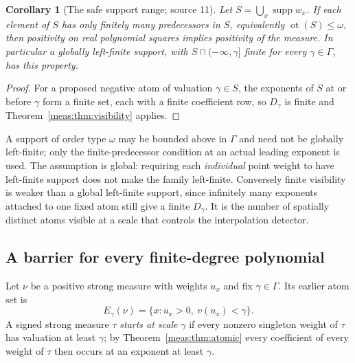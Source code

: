 \documentclass[11pt]{article}
\numberwithin{equation}{section}
\newtheorem{corollary}[theorem]{Corollary}
\theoremstyle{definition}
\theoremstyle{remark}
\newcommand{\supp}{\operatorname{supp}}
\newcommand{\ot}{\operatorname{ot}}
\begin{document}
\begin{corollary}[The safe support range; source 11]\label{meas:cor:safesupport}
Let $S=\bigcup_x\supp w_x$. If each element of $S$ has only finitely many
predecessors in $S$, equivalently $\ot(S)\le\omega$, then positivity on real
polynomial squares implies positivity of the measure. In particular a
globally left-finite support, with $S\cap(-\infty,\gamma]$ finite for every
$\gamma\in\Gamma$, has this property.
\end{corollary}
\begin{proof}
For a proposed negative atom of valuation $\gamma\in S$, the exponents of $S$ at
or before $\gamma$ form a finite set, each with a finite coefficient row, so
$D_\gamma$ is finite and Theorem~\ref{meas:thm:visibility} applies.
\end{proof}

A support of order type $\omega$ may be bounded above in $\Gamma$ and need not
be globally left-finite; only the finite-predecessor condition at an actual
leading exponent is used. The assumption is global: requiring each
\emph{individual} point weight to have left-finite support does not make the
family left-finite. Conversely finite visibility is weaker than a global
left-finite support, since infinitely many exponents attached to one fixed
atom still give a finite $D_\gamma$. It is the number of spatially distinct
atoms visible at a scale that controls the interpolation detector.

\subsection{A barrier for every finite-degree polynomial}

Let $\nu$ be a positive strong measure with weights $u_x$ and fix
$\gamma\in\Gamma$. Its earlier atom set is
\[
 E_\gamma(\nu)=\{x:u_x>0,\ v(u_x)<\gamma\}.
\]
A signed strong measure $\tau$ \emph{starts at scale} $\gamma$ if every nonzero
singleton weight of $\tau$ has valuation at least $\gamma$; by
Theorem~\ref{meas:thm:atomic} every coefficient of every weight of $\tau$ then
occurs at an exponent at least $\gamma$.
\end{document}
